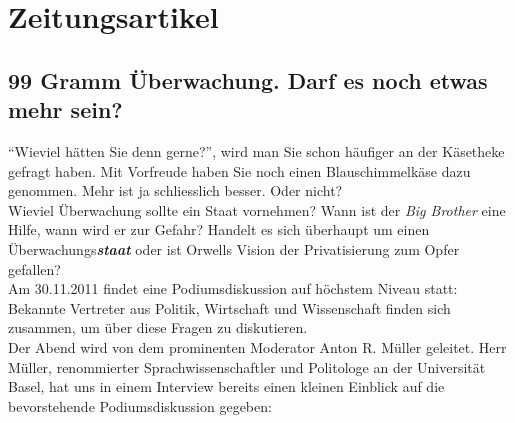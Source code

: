 \section{Zeitungsartikel}
\subsection*{99 Gramm Überwachung. Darf es noch etwas mehr sein?}
"`Wieviel hätten Sie denn gerne?"', wird man Sie schon
häufiger an der Käsetheke gefragt haben. Mit Vorfreude haben
Sie noch einen Blauschimmelkäse dazu genommen. Mehr ist ja
schliesslich besser. Oder nicht?\\
Wieviel Überwachung sollte ein Staat vornehmen? Wann ist
der \textit{Big Brother} eine Hilfe, wann wird er zur Gefahr?
Handelt es sich überhaupt um einen Überwachungs\textbf{\textit{staat}}
oder ist Orwells Vision der Privatisierung zum Opfer gefallen?\\
Am 30.11.2011 findet eine Podiumsdiskussion auf höchstem Niveau statt:
Bekannte Vertreter aus Politik, Wirtschaft
und Wissenschaft finden sich zusammen, um über diese Fragen zu diskutieren.\\ 
Der Abend wird von dem prominenten Moderator Anton R. Müller
geleitet. Herr Müller, renommierter Sprachwissenschaftler und Politologe
an der Universität Basel, hat uns in
einem Interview bereits einen kleinen Einblick auf die
bevorstehende Podiumsdiskussion gegeben:

